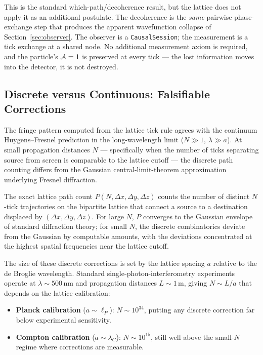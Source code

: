 This is the standard which-path/decoherence result, but the lattice
does not apply it as an additional postulate. The decoherence is the
\emph{same} pairwise phase-exchange step that produces the apparent
wavefunction collapse of Section~\ref{sec:observer}. The observer is
a \texttt{CausalSession}; the measurement is a tick exchange at a
shared node. No additional measurement axiom is required, and the
particle's $\mathcal{A}=1$ is preserved at every tick --- the lost
information moves into the detector, it is not destroyed.

\subsection{Discrete versus Continuous: Falsifiable Corrections}
\label{subsec:discrete_corrections}

The fringe pattern computed from the lattice tick rule agrees with
the continuum Huygens--Fresnel prediction in the long-wavelength
limit ($N \gg 1$, $\lambda \gg a$). At small propagation distances
$N$ --- specifically when the number of ticks separating source from
screen is comparable to the lattice cutoff --- the discrete path
counting differs from the Gaussian central-limit-theorem
approximation underlying Fresnel diffraction.

The exact lattice path count $P(N, \Delta x, \Delta y, \Delta z)$
counts the number of distinct $N$-tick trajectories on the bipartite
lattice that connect a source to a destination displaced by
$(\Delta x, \Delta y, \Delta z)$. For large $N$, $P$ converges to the
Gaussian envelope of standard diffraction theory; for small $N$, the
discrete combinatorics deviate from the Gaussian by computable
amounts, with the deviations concentrated at the highest spatial
frequencies near the lattice cutoff.

The size of these discrete corrections is set by the lattice spacing
$a$ relative to the de Broglie wavelength. Standard
single-photon-interferometry experiments operate at $\lambda \sim
500\,\text{nm}$ and propagation distances $L \sim 1\,\text{m}$,
giving $N \sim L/a$ that depends on the lattice calibration:

\begin{itemize}
    \item \textbf{Planck calibration} ($a \sim \ell_P$): $N \sim 10^{34}$,
    putting any discrete correction far below experimental sensitivity.
    \item \textbf{Compton calibration} ($a \sim \lambda_C$): $N \sim 10^{15}$,
    still well above the small-$N$ regime where corrections are
    measurable.
\end{itemize}

